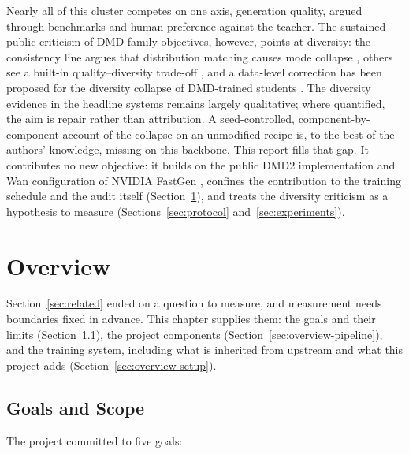 \documentclass[11pt,a4paper]{article}
\begin{document}
Nearly all of this cluster competes on one axis, generation quality, argued through benchmarks and human preference against the teacher. The sustained public criticism of DMD-family objectives, however, points at diversity: the consistency line argues that distribution matching causes mode collapse \cite{rcm}, others see a built-in quality–diversity trade-off \cite{piflow}, and a data-level correction has been proposed for the diversity collapse of DMD-trained students \cite{dataforcing}. The diversity evidence in the headline systems remains largely qualitative; where quantified, the aim is repair rather than attribution. A seed-controlled, component-by-component account of the collapse on an unmodified recipe is, to the best of the authors' knowledge, missing on this backbone. This report fills that gap. It contributes no new objective: it builds on the public DMD2 implementation and Wan configuration of NVIDIA FastGen \cite{fastgen}, confines the contribution to the training schedule and the audit itself (Section~\ref{sec:overview}), and treats the diversity criticism as a hypothesis to measure (Sections~\ref{sec:protocol} and~\ref{sec:experiments}).

\section{Overview}\label{sec:overview}

Section~\ref{sec:related} ended on a question to measure, and measurement needs boundaries fixed in advance. This chapter supplies them: the goals and their limits (Section~\ref{sec:overview-goals}), the project components (Section~\ref{sec:overview-pipeline}), and the training system, including what is inherited from upstream and what this project adds (Section~\ref{sec:overview-setup}).

\subsection{Goals and Scope}\label{sec:overview-goals}

The project committed to five goals:
\end{document}
